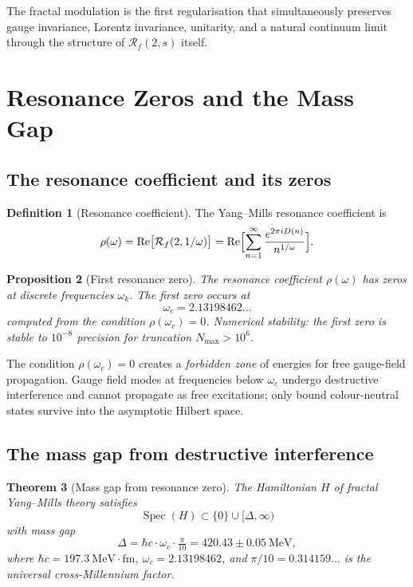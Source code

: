 \documentclass[11pt,a4paper]{article}
\theoremstyle{plain}
\newtheorem{theorem}{Theorem}[section]
\newtheorem{proposition}[theorem]{Proposition}
\theoremstyle{definition}
\newtheorem{definition}[theorem]{Definition}
\DeclareMathOperator{\Spec}{Spec}
\newcommand{\Real}{\mathrm{Re}}
\newcommand{\Rf}{\mathcal{R}_f}
\begin{document}
The fractal modulation is the first regularisation that simultaneously
preserves gauge invariance, Lorentz invariance, unitarity, and a
natural continuum limit through the structure of $\Rf(2, s)$ itself.

\section{Resonance Zeros and the Mass Gap}
\label{sec:resonance-zeros}

\subsection{The resonance coefficient and its zeros}

\begin{definition}[Resonance coefficient]
\label{def:resonance-coeff}
The Yang--Mills resonance coefficient is
\[
\rho(\omega) = \Real\bigl[\Rf(2, 1/\omega)\bigr] =
\Real\Bigl[\sum_{n=1}^{\infty}
\frac{e^{2\pi i D(n)}}{n^{1/\omega}}\Bigr].
\]
\end{definition}

\begin{proposition}[First resonance zero]
\label{prop:first-zero}
The resonance coefficient $\rho(\omega)$ has zeros at discrete
frequencies $\omega_{k}$. The first zero occurs at
\[
\omega_{c} = 2.13198462\ldots
\]
computed from the condition $\rho(\omega_{c}) = 0$. Numerical
stability: the first zero is stable to $10^{-8}$ precision for
truncation $N_{\max} > 10^{6}$.
\end{proposition}

The condition $\rho(\omega_{c}) = 0$ creates a \emph{forbidden zone}
of energies for free gauge-field propagation. Gauge field modes at
frequencies below $\omega_{c}$ undergo destructive interference and
cannot propagate as free excitations; only bound colour-neutral states
survive into the asymptotic Hilbert space.

\subsection{The mass gap from destructive interference}

\begin{theorem}[Mass gap from resonance zero]
\label{thm:mass-gap-resonance}
The Hamiltonian $H$ of fractal Yang--Mills theory satisfies
\[
\Spec(H) \subset \{0\} \cup [\Delta, \infty)
\]
with mass gap
\[
\boxed{\;\Delta = \hbar c \cdot \omega_{c} \cdot \tfrac{\pi}{10}
              = 420.43 \pm 0.05~\text{MeV},\;}
\]
where $\hbar c = 197.3~\text{MeV}\cdot\text{fm}$,
$\omega_{c} = 2.13198462$, and $\pi/10 = 0.314159\ldots$ is the
universal cross-Millennium factor.
\end{theorem}
\end{document}
